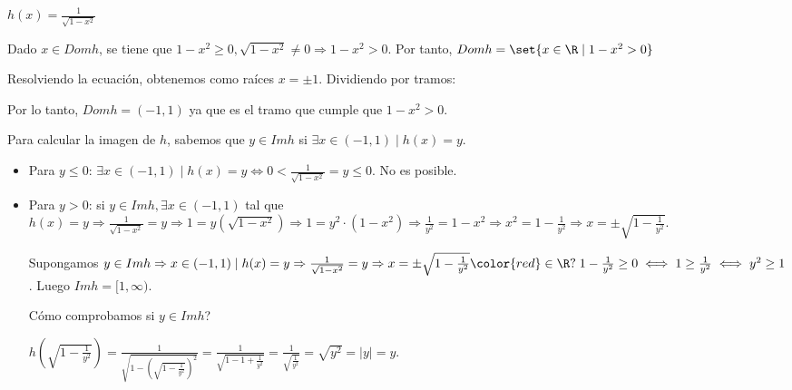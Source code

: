 \begin{example}
	\(h(x) = \frac{1}{\sqrt{1 - x^{2} } }\)

	Dado \(x \in Domh \), se tiene que \(1 - x^{2} \geq 0, \sqrt{1 - x^{2}}  \neq 0 \Rightarrow 1-x^{2}  > 0 \). Por tanto, \(Domh = \set{x \in \R \mid 1 - x^{2} > 0  }\)

	Resolviendo la ecuación, obtenemos como raíces \(x = \pm 1 \). Dividiendo por tramos:

	\begin{figure}[H]
		\centering
	\end{figure}
	Por lo tanto, \(Domh = (-1,1 )\) ya que es el tramo que cumple que \(1 - x^{2} > 0\).

	Para calcular la imagen de \(h \), sabemos que \( y \in Imh\) si \(\exists x \in (-1,1) \mid h(x) = y\).

	\begin{itemize}
		\item Para \(y \leq  0 \): \(\exists x \in (-1,1) \mid h(x) = y \iff 0 < \frac{1}{\sqrt{1 - x^{2} } } = y \leq  0\). No es posible.
		\item Para \(y > 0 \): si \(y \in Imh, \exists x \in (-1,1 )\) tal que \(h(x) = y \Rightarrow \frac{1}{\sqrt{1 - x^{2} } } = y \Rightarrow 1 = y(\sqrt{1 - x^{2} } ) \Rightarrow 1 = y^{2} \cdot (1 - x^{2} ) \Rightarrow \frac{1}{y^{2} } = 1 - x^{2} \Rightarrow x^{2} = 1 - \frac{1}{y^{2} } \Rightarrow x = \pm \sqrt{1 - \frac{1}{y^{2} }}\).

		      Supongamos \(y \in Imh \Rightarrow x \in (-1,1) \mid h(x) = y \Rightarrow \frac{1}{\sqrt{1 - x^{2} } } = y \Rightarrow x = \pm \sqrt{1 - \frac{1}{y^{2} }} {\color{red}\in \R ? } \; 1 - \frac{1}{y^{2} } \geq 0 \iff 1 \geq  \frac{1}{y^{2} } \iff y^{2} \geq 1  \). Luego \(Imh = [1,\infty)\).

		      Cómo comprobamos si \(y \in Imh \)?

		      \(h(\sqrt{1 - \frac{1}{y^{2} }} ) = \frac{1}{\sqrt{1 - (\sqrt{1 - \frac{1}{y^{2} }} )^{2} } } = \frac{1}{\sqrt{1 - 1 + \frac{1}{y^{2} }} } = \frac{1}{\sqrt{\frac{1}{y^{2}}} } = \sqrt{y^{2} } = |y| = y\).


\end{itemize}
\end{example}
